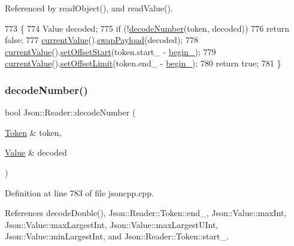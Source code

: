 Referenced by read\+Object(), and read\+Value().


\begin{DoxyCode}
773                                       \{
774   Value decoded;
775   \textcolor{keywordflow}{if} (!\hyperlink{class_json_1_1_reader_a442d1f23edf0f4350f5eeab3ee3f7d46}{decodeNumber}(token, decoded))
776     \textcolor{keywordflow}{return} \textcolor{keyword}{false};
777   \hyperlink{class_json_1_1_reader_a85597f763fb0148a17359b6dfc6f7326}{currentValue}().\hyperlink{class_json_1_1_value_a5263476047f20e2fc6de470e4de34fe5}{swapPayload}(decoded);
778   \hyperlink{class_json_1_1_reader_a85597f763fb0148a17359b6dfc6f7326}{currentValue}().\hyperlink{class_json_1_1_value_a92e32ea0f4f8a15853a3cf0beac9feb9}{setOffsetStart}(token.start\_ - \hyperlink{class_json_1_1_reader_a327166839022ea91f0a8290960a8af76}{begin\_});
779   \hyperlink{class_json_1_1_reader_a85597f763fb0148a17359b6dfc6f7326}{currentValue}().\hyperlink{class_json_1_1_value_a5e4f5853fec138150c5df6004a8c2bcf}{setOffsetLimit}(token.end\_ - \hyperlink{class_json_1_1_reader_a327166839022ea91f0a8290960a8af76}{begin\_});
780   \textcolor{keywordflow}{return} \textcolor{keyword}{true};
781 \}
\end{DoxyCode}
\mbox{\label{class_json_1_1_reader_a72f426ce3fa384d14aa10e9dd75618f0}} 
\subsubsection{\texorpdfstring{decode\+Number()}{decodeNumber()}\hspace{0.1cm}{\footnotesize\ttfamily [2/2]}}
{\footnotesize\ttfamily bool Json\+::\+Reader\+::decode\+Number (\begin{DoxyParamCaption}\item[{\hyperlink{class_json_1_1_reader_1_1_token}{Token} \&}]{token,  }\item[{\hyperlink{class_json_1_1_value}{Value} \&}]{decoded }\end{DoxyParamCaption})\hspace{0.3cm}{\ttfamily [private]}}



Definition at line 783 of file jsoncpp.\+cpp.



References decode\+Double(), Json\+::\+Reader\+::\+Token\+::end\+\_\+, Json\+::\+Value\+::max\+Int, Json\+::\+Value\+::max\+Largest\+Int, Json\+::\+Value\+::max\+Largest\+U\+Int, Json\+::\+Value\+::min\+Largest\+Int, and Json\+::\+Reader\+::\+Token\+::start\+\_\+.


